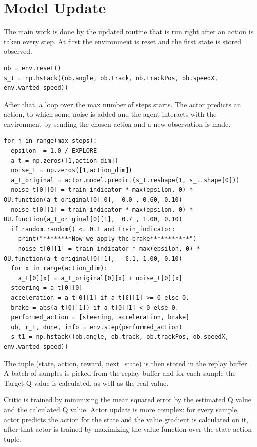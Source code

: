 \documentclass[Lau,oneside,noexaminfo]{sapthesis} %
\begin{document}
\section{Model Update}
The main work is done by the updated routine that is run right after an action is taken every step.
At first the environment is reset and the first state is stored observed.
\begin{lstlisting}
ob = env.reset()
s_t = np.hstack((ob.angle, ob.track, ob.trackPos, ob.speedX, env.wanted_speed))
\end{lstlisting}
After that, a loop over the max number of steps starts. The actor predicts an action, to which some noise is added and the agent interacts with the environment by sending the chosen action and a new observation is made.
\begin{lstlisting}[firstnumber=3]
for j in range(max_steps):
  epsilon -= 1.0 / EXPLORE
  a_t = np.zeros([1,action_dim])
  noise_t = np.zeros([1,action_dim])
  a_t_original = actor.model.predict(s_t.reshape(1, s_t.shape[0]))
  noise_t[0][0] = train_indicator * max(epsilon, 0) * OU.function(a_t_original[0][0],  0.0 , 0.60, 0.10)
  noise_t[0][1] = train_indicator * max(epsilon, 0) * OU.function(a_t_original[0][1],  0.7 , 1.00, 0.10)
  if random.random() <= 0.1 and train_indicator:
    print("********Now we apply the brake***********")
    noise_t[0][1] = train_indicator * max(epsilon, 0) * OU.function(a_t_original[0][1],  -0.1, 1.00, 0.10)
  for x in range(action_dim):
    a_t[0][x] = a_t_original[0][x] + noise_t[0][x]
  steering = a_t[0][0]
  acceleration = a_t[0][1] if a_t[0][1] >= 0 else 0.
  brake = abs(a_t[0][1]) if a_t[0][1] < 0 else 0.
  performed_action = [steering, acceleration, brake]
  ob, r_t, done, info = env.step(performed_action)
  s_t1 = np.hstack((ob.angle, ob.track, ob.trackPos, ob.speedX, env.wanted_speed))
\end{lstlisting}
The tuple (state, action, reward, next\_state) is then stored in the replay buffer. A batch of samples is picked from the replay buffer and for each sample the Target Q value is calculated, as well as the real value. 

Critic is trained by minimizing the mean squared error by the estimated Q value and the calculated Q value. Actor update is more complex: for every sample, actor predicts the action for the state and the value gradient is calculated on it, after that actor is trained by maximizing the value function over the state-action tuple. 
\end{document}
